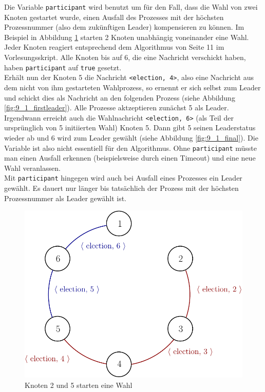 Die Variable \verb+participant+ wird benutzt um für den Fall, dass die Wahl
von zwei Knoten gestartet wurde, einen Ausfall des Prozesses mit der höchsten
Prozessnummer (also dem zukünftigen Leader) kompensieren zu können.
Im Beispiel in Abbildung \ref{fig:9_1_start} starten 2 Knoten unabhängig voneinander
eine Wahl. Jeder Knoten reagiert entsprechend dem Algorithmus von Seite 11 im
Vorlesungsskript. Alle Knoten bis auf 6, die eine Nachricht verschickt haben,
haben \verb+participant+ auf \verb+true+ gesetzt. \\
Erhält nun der Knoten 5 die Nachricht \verb+<election, 4>+, also eine
Nachricht aus dem nicht von ihm gestarteten Wahlprozess, so ernennt er sich selbst
zum Leader und schickt dies als Nachricht an den folgenden Prozess (siehe
Abbildung \ref{fig:9_1_firstleader}). Alle Prozesse aktzeptieren zunächst 5 als
Leader. \\
Irgendwann erreicht auch die Wahlnachricht \verb+<election, 6>+ (als Teil
der ursprünglich von 5 initiierten Wahl) Knoten 5. Dann gibt 5 seinen Leaderstatus wieder ab
und 6 wird zum Leader gewählt (siehe Abbildung \ref{fig:9_1_final}).
Die Variable ist also nicht essentiell für den Algorithmus. Ohne
\verb+participant+ müsste man einen Ausfall erkennen (beispielsweise durch
einen Timeout) und eine neue Wahl veranlassen. \\
Mit \verb+participant+ hingegen wird auch bei Ausfall eines Prozesses ein Leader gewählt. Es dauert nur
länger bis tatsächlich der Prozess mit der höchsten Prozessnummer als Leader
gewählt ist.
\begin{figure}
  \begin{center}
    \includegraphics{pics/9_1_1.pdf}
  \end{center}
  \caption{Knoten 2 und 5 starten eine Wahl}
  \label{fig:9_1_start}
\end{figure}


